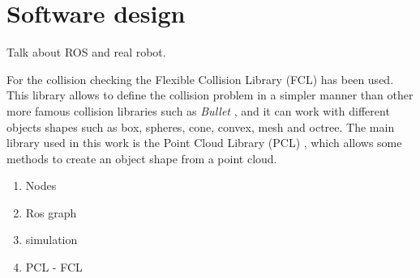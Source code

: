 \chapter{Software design}
\label{ch:software_design}
Talk about ROS and real robot. 

For the collision checking the Flexible Collision Library (FCL) \citep{pan2012fcl} has been used. This library allows to define the collision problem in a simpler manner than other more famous collision libraries such as \textit{Bullet} \citep{Bullet}, and it can work with different objects shapes such as box, spheres, cone, convex, mesh and octree. 
The main library used in this work is the Point Cloud Library (PCL) \citep{PCL_}, which allows some methods to create an object shape from a point cloud.

\begin{enumerate}
\item Nodes
\item Ros graph 
\item simulation
\item PCL - FCL 
\end{enumerate}
